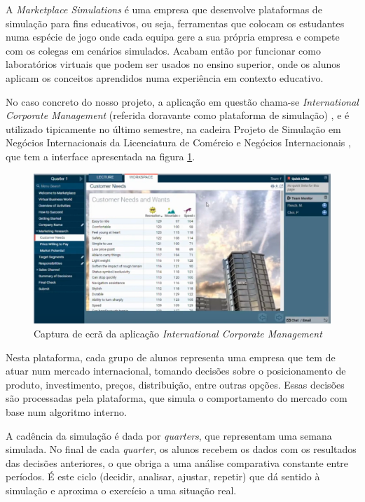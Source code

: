 A \textit{Marketplace Simulations} \cite{MarketplaceSim_2025} é uma empresa que desenvolve plataformas de simulação para fins educativos, ou seja, ferramentas que colocam os estudantes numa espécie de jogo onde cada equipa gere a sua própria empresa e compete com os colegas em cenários simulados. Acabam então por funcionar como laboratórios virtuais que podem ser usados no ensino superior, onde os alunos aplicam os conceitos aprendidos numa experiência em contexto educativo.

No caso concreto do nosso projeto, a aplicação em questão chama-se \textit{International Corporate Management} (referida doravante como plataforma de simulação) \cite{MarketplaceSim_2025}, e é utilizado tipicamente no último semestre, na cadeira Projeto de Simulação em Negócios Internacionais da Licenciatura de Comércio e Negócios Internacionais \cite{FUC_ISCAL_2025}, que tem a interface apresentada na figura \ref{fig:marketplace1}.

\begin{figure}[h]
    \centering
    \includegraphics[max width=\textwidth]{./img/marketplace1}
 \caption{Captura de ecrã da aplicação \textit{International Corporate Management}}
 \label{fig:marketplace1}
 \end{figure}

Nesta plataforma, cada grupo de alunos representa uma empresa que tem de atuar num mercado internacional, tomando decisões sobre o posicionamento de produto, investimento, preços, distribuição, entre outras opções. Essas decisões são processadas pela plataforma, que simula o comportamento do mercado com base num algoritmo interno. 

A cadência da simulação é dada por \textit{\textit{quarters}}, que representam uma semana simulada. No final de cada \textit{quarter}, os alunos recebem os dados com os resultados das decisões anteriores, o que obriga a uma análise comparativa constante entre períodos. É este ciclo (decidir, analisar, ajustar, repetir) que dá sentido à simulação e aproxima o exercício a uma situação real.

